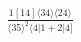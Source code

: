 \documentclass[varwidth, border=5pt]{standalone}
\begin{document}
\begin{my}
$\begin{gathered}
\scriptscriptstyle\frac{1[14]⟨34⟩⟨24⟩}{⟨35⟩^2⟨4|1+2|4]}
\end{gathered}$
\end{my}
\end{document}
